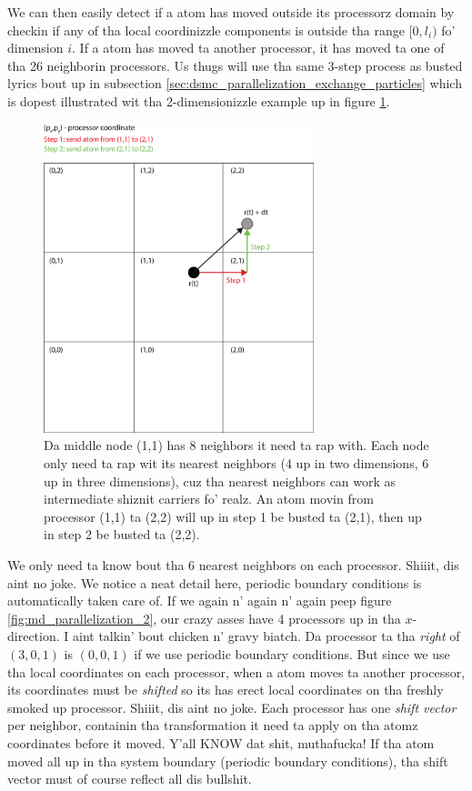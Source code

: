 We can then easily detect if a atom has moved outside its processorz domain by checkin if any of tha local coordinizzle components is outside tha range $[0, l_i)$ fo' dimension $i$. If a atom has moved ta another processor, it has moved ta one of tha 26 neighborin processors. Us thugs will use tha same 3-step process as busted lyrics bout up in subsection \ref{sec:dsmc_parallelization_exchange_particles} which is dopest illustrated wit tha 2-dimensionizzle example up in figure \ref{fig:md_parallelization_facet_technique}.
\begin{figure}[h!]
\begin{center}
\includegraphics[width=0.7\textwidth, trim=0cm 0cm 0cm 0cm, clip]{MD/figures/parallelization_facet_technique.eps}
\end{center}
\caption{Da middle node (1,1) has 8 neighbors it need ta rap with. Each node only need ta rap wit its nearest neighbors (4 up in two dimensions, 6 up in three dimensions), cuz tha nearest neighbors can work as intermediate shiznit carriers fo' realz. An atom movin from processor (1,1) ta (2,2) will up in step 1 be busted ta (2,1), then up in step 2 be busted ta (2,2).}
\label{fig:md_parallelization_facet_technique}
\end{figure}
We only need ta know bout tha 6 nearest neighbors on each processor. Shiiit, dis aint no joke. We notice a neat detail here, periodic boundary conditions is automatically taken care of. If we again n' again n' again peep figure \ref{fig:md_parallelization_2}, our crazy asses have 4 processors up in tha $x$-direction. I aint talkin' bout chicken n' gravy biatch. Da processor ta tha \textit{right} of $(3,0,1)$ is $(0,0,1)$ if we use periodic boundary conditions. But since we use tha local coordinates on each processor, when a atom moves ta another processor, its coordinates must be \textit{shifted} so its has erect local coordinates on tha freshly smoked up processor. Shiiit, dis aint no joke. Each processor has one \textit{shift vector} per neighbor, containin tha transformation it need ta apply on tha atomz coordinates before it moved. Y'all KNOW dat shit, muthafucka! If tha atom moved all up in tha system boundary (periodic boundary conditions), tha shift vector must of course reflect all dis bullshit. 